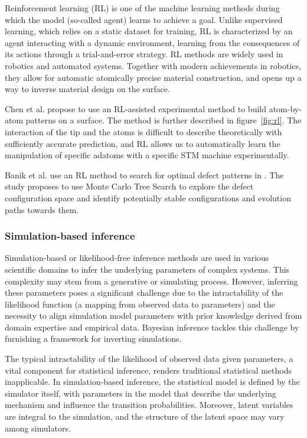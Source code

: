 Reinforcement learning (RL) \cite{mousavi2018deep} is one of the machine learning methods during which the model (so-called agent) learns to achieve a goal. Unlike supervised learning, which relies on a static dataset for training, RL is characterized by an agent interacting with a dynamic environment, learning from the consequences of its actions through a trial-and-error strategy. RL methods are widely used in robotics and automated systems. Together with modern achievements in robotics, they allow for automatic
atomically precise material construction, and opens up a way to inverse material design on the surface.

Chen et al. \cite{chen2022precise} propose to use an RL-assisted experimental method to build atom-by-atom  patterns on a  surface. The method is further described in figure~\ref{fig:rl}. The interaction of the tip and the atoms is difficult to describe theoretically with sufficiently accurate prediction, and RL allows us to automatically learn the manipulation of specific adatoms with a specific STM machine experimentally.

Banik et al. \cite{banik2021learning} use an RL method to search for optimal defect patterns in . The study proposes to use Monte Carlo Tree Search to explore the defect configuration space and identify potentially stable configurations and evolution paths towards them. 

\subsubsection{Simulation-based inference}
Simulation-based or likelihood-free inference methods are used in various scientific domains to infer the underlying parameters of complex systems. This complexity may stem from a generative or simulating process. However, inferring these parameters poses a significant challenge due to the intractability of the likelihood function (a mapping from observed data to parameters) and the necessity to align simulation model parameters with prior knowledge derived from domain expertise and empirical data. Bayesian inference tackles this challenge by furnishing a framework for inverting simulations.

The typical intractability of the likelihood of observed data given parameters, a vital component for statistical inference, renders traditional statistical methods inapplicable. In simulation-based inference, the statistical model is defined by the simulator itself, with parameters in the model that describe the underlying mechanism and influence the transition probabilities. Moreover, latent variables are integral to the simulation, and the structure of the latent space may vary among simulators.

